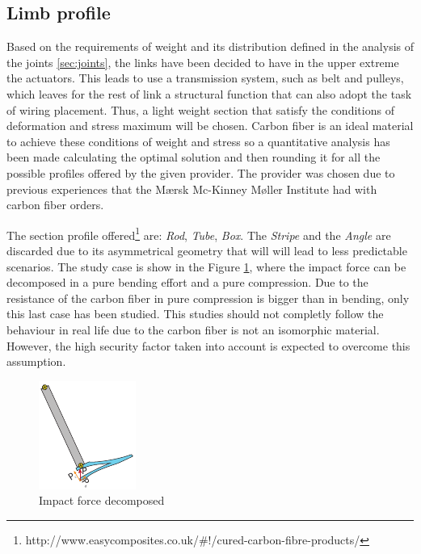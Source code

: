 \subsection{Limb profile} %
\label{sub:limb_profile}
Based on the requirements of weight and its distribution defined in the analysis of the joints \ref{sec:joints}, the links have been decided to have in the upper extreme the actuators. 
This leads to use a transmission system, such as belt and pulleys, which leaves for the rest of link a structural function that can also adopt the task of wiring placement.
Thus, a light weight section that satisfy the conditions of deformation and stress maximum will be chosen.
Carbon fiber is an ideal material to achieve these conditions of weight and stress so a quantitative analysis has been made calculating the optimal solution and then rounding it for all the possible profiles offered by the given provider.
The provider was chosen due to previous experiences that the Mærsk Mc-Kinney Møller Institute had with carbon fiber orders.

The section profile offered\footnote{http://www.easycomposites.co.uk/\#!/cured-carbon-fibre-products/} are: \textit{Rod}, \textit{Tube}, \textit{Box}. The \textit{Stripe} and the \textit{Angle} are discarded due to its asymmetrical geometry that will will lead to less predictable scenarios.
The study case is show in the Figure \ref{fig:impact_decomposition}, where the impact force can be decomposed in a pure bending effort and a pure compression.
Due to the resistance of the carbon fiber in pure compression is bigger than in bending, only this last case has been studied.
This studies should not completly follow the behaviour in real life due to the carbon fiber is not an isomorphic material.
However, the high security factor taken into account is expected to overcome this assumption.

\begin{figure}[ht!]
  \centering
  \includegraphics[width=.3\textwidth]{figures/impact_decomposition.pdf}
  \caption{Impact force decomposed}
  \label{fig:impact_decomposition}
\end{figure}

